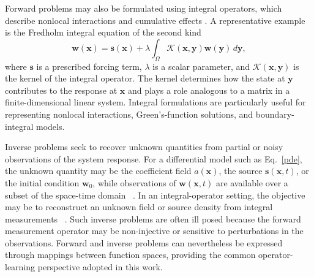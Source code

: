 \documentclass[preprint,numbers,sort&compress]{elsarticle}
\begin{document}
		Forward problems may also be formulated using integral operators, which describe nonlocal interactions and cumulative effects \cite{zappala2024learning,georgiou2025fredholm}. A representative example is the Fredholm integral equation of the second kind
		\begin{equation}\label{integral}
			\boldsymbol{w}(\mathbf{x}) = \boldsymbol{s}(\mathbf{x}) + \lambda \int_{\Omega}\mathcal{K}(\mathbf{x},  \mathbf{y}) \boldsymbol{w}(\mathbf{y}) \, d\mathbf{y},
		\end{equation}
		where $\boldsymbol s$ is a prescribed forcing term, $\lambda$ is a scalar parameter, and $\mathcal K(\mathbf x,\mathbf y)$ is the kernel of the integral operator. The kernel determines how the state at $\mathbf y$ contributes to the response at $\mathbf x$ and plays a role analogous to a matrix in a finite-dimensional linear system. Integral formulations are particularly useful for representing nonlocal interactions,
		Green's-function solutions, and boundary-integral models.
		
		
		Inverse problems seek to recover unknown quantities from partial or noisy observations of the system response. For a differential model such as Eq.~\eqref{pde}, the unknown quantity may be the coefficient field $a(\mathbf x)$, the source $\boldsymbol s(\mathbf x,t)$, or the initial
		condition $\boldsymbol w_0$, while observations of
		$\boldsymbol w(\mathbf x,t)$ are available over a subset of the space-time domain ~\cite{azizzadenesheli2024neural}. In an integral-operator setting, the objective may be to reconstruct an unknown field or source density from integral measurements ~\cite{wu2022neural}. Such inverse problems are often ill posed because the forward measurement operator may be non-injective or sensitive to perturbations in the observations. Forward and inverse problems can nevertheless be expressed through mappings between function spaces, providing the common operator-learning perspective adopted in this work.
		
\end{document}
